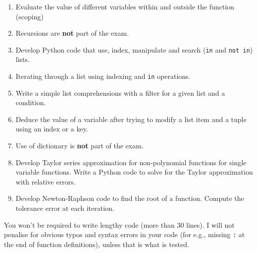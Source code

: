 \documentclass[]{article}
\begin{document}
\begin{enumerate}
	\item Evaluate the value of different variables within and outside the function (scoping)
	\item Recursions are \textbf{not} part of the exam.
	\item Develop Python code that use, index, manipulate and search (\verb|in| and \verb|not in|) lists.
	\item Iterating through a list using indexing and \verb|in| operations.
	\item Write a simple list comprehensions with a filter for a given list and a condition.
	\item Deduce the value of a variable after trying to modify a list item and a tuple using an index or a key.
	\item Use of dictionary is \textbf{not} part of the exam.
	\item Develop Taylor series approximation for non-polynomial functions for single variable functions. Write a Python code to solve for the Taylor approximation with relative errors.
	\item Develop Newton-Raphson code to find the root of a function. Compute the tolerance error at each iteration.
\end{enumerate}

You won't be required to write lengthy code (more than 30 lines). I will not penalise for obvious typos and syntax errors in your code (for e.g., missing \verb|:| at the end of function definitions), unless that is what is tested.
\end{document}
